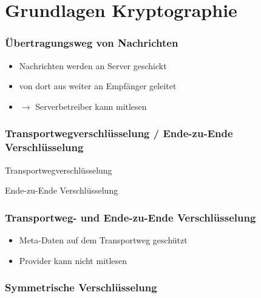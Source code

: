 \section{Grundlagen Kryptographie}


\begin{frame}
  \frametitle{Übertragungsweg von Nachrichten}
  \center {}
  \begin{itemize}
    \item Nachrichten werden an Server geschickt
    \item von dort aus weiter an Empfänger geleitet
    \item $\rightarrow$ Serverbetreiber kann mitlesen
  \end{itemize}

\end{frame}

\begin{frame}
  \frametitle{Transportwegverschlüsselung / Ende-zu-Ende Verschlüsselung}
  Transportwegverschlüsselung
  \begin{center}
  \end{center}


  Ende-zu-Ende Verschlüsselung
  \center {}
\end{frame}

\begin{frame}
  \frametitle{Transportweg- und Ende-zu-Ende Verschlüsselung}
  \begin{center}
  \end{center}
  \begin{itemize}
    \item Meta-Daten auf dem Transportweg geschützt
    \item Provider kann nicht mitlesen
  \end{itemize}
\end{frame}


\begin{frame}
  \frametitle{Symmetrische Verschlüsselung}
  \center {}
\end{frame}

